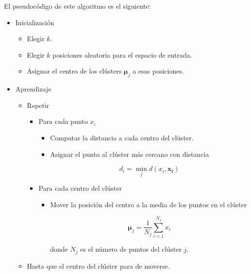 El pseudocódigo de este algoritmo es el siguiente:

\begin{itemize}
\item Inicialización

\begin{itemize}
\item Elegir $k$.
\item Elegir $k$ posiciones aleatoria para el espacio de entrada.
\item Asignar el centro de los clústers $\mathbf{\mu}_j$ a esas posiciones.
\end{itemize}

\item Aprendizaje

\begin{itemize}
\item Repetir

\begin{itemize}
\item Para cada punto $x_i$

\begin{itemize}
\item Computar la distancia a cada centro del clúster.
\item Asignar el punto al clúster más cercano con distancia

\begin{equation}
d_i = \min_j d(x_i, \mathbf{x_i})
\end{equation}
\end{itemize}

\item Para cada centro del clúster

\begin{itemize}
\item Mover la posición del centro a la media de los puntos en el clúster

\begin{equation}
\mathbf{\mu}_j = \dfrac{1}{N_j} \sum_{i=1}^{N_j} x_i
\end{equation}

donde $N_j$ es el número de puntos del clúster $j$.
\end{itemize}

\end{itemize}

\item Hasta que el centro del clúster para de moverse.

\end{itemize}

\end{itemize}  

